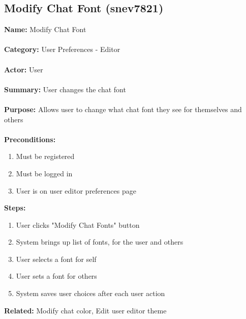 \documentclass[11pt]{report}
\begin{document}
\subsection{Modify Chat Font (snev7821)}
\begin{framed}
	\noindent\textbf{Name:} Modify Chat Font \\ \\
	\textbf{Category:} User Preferences - Editor  \\ \\
	\textbf{Actor:} User \\ \\
	\textbf{Summary:} User changes the chat font \\ \\
	\textbf{Purpose:} Allows user to change what chat font they see for themselves and others \\ \\
	\textbf{Preconditions:} 
	\begin{enumerate}
		\item Must be registered
		\item Must be logged in
		\item User is on user editor preferences page
	\end{enumerate}
	\textbf{Steps:}
	\begin{enumerate}
		\item User clicks "Modify Chat Fonts" button
		\item System brings up list of fonts, for the user and others
		\item User selects a font for self
		\item User sets a font for others
		\item System saves user choices after each user action
	\end{enumerate}
	\textbf{Related:} Modify chat color, Edit user editor theme
\end{framed}

\newpage
\end{document}
